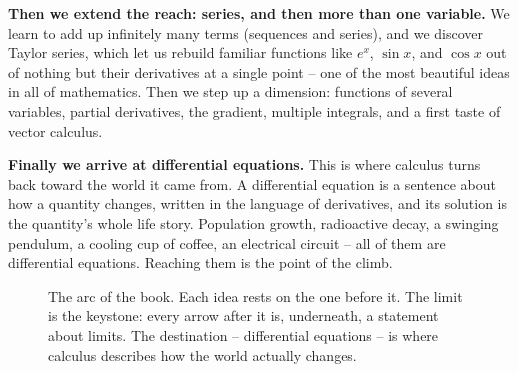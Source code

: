 \textbf{Then we extend the reach: series, and then more than one variable.} We learn to add up
infinitely many terms (sequences and series), and we discover Taylor series, which let us rebuild
familiar functions like $e^x$, $\sin x$, and $\cos x$ out of nothing but their derivatives at a
single point -- one of the most beautiful ideas in all of mathematics. Then we step up a dimension:
functions of several variables, partial derivatives, the gradient, multiple integrals, and a first
taste of vector calculus.

\textbf{Finally we arrive at differential equations.} This is where calculus turns back toward the
world it came from. A differential equation is a sentence about how a quantity changes, written in
the language of derivatives, and its solution is the quantity's whole life story. Population growth,
radioactive decay, a swinging pendulum, a cooling cup of coffee, an electrical circuit -- all of
them are differential equations. Reaching them is the point of the climb.

\begin{figure}[h]
\centering
{}
\caption{The arc of the book. Each idea rests on the one before it. The limit is the keystone: every
arrow after it is, underneath, a statement about limits. The destination -- differential equations --
is where calculus describes how the world actually changes.}
\label{ch00:arc}
\end{figure}

